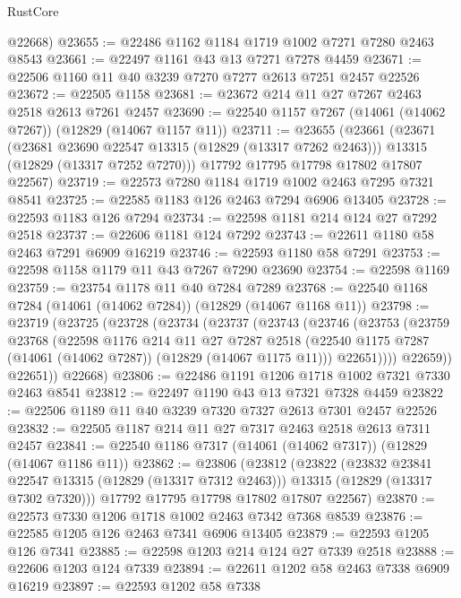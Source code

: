 \begin{lexlean}{RustCore}
\begin{coremodule}
      @22668)
@23655 := @22486 @1162 @1184 @1719 @1002 @7271 @7280 @2463 @8543
@23661 := @22497 @1161 @43 @13 @7271 @7278 @4459
@23671 := @22506 @1160 @11 @40 @3239 @7270 @7277 @2613 @7251 @2457 @22526
@23672 := @22505 @1158
@23681 := @23672 @214 @11 @27 @7267 @2463 @2518 @2613 @7261 @2457
@23690 := @22540 @1157 @7267 (@14061 (@14062 @7267)) (@12829 (@14067 @1157 @11))
@23711 := @23655
    (@23661
      (@23671
        (@23681 @23690 @22547 @13315 (@12829 (@13317 @7262 @2463)))
        @13315
        (@12829 (@13317 @7252 @7270)))
      @17792
      @17795
      @17798
      @17802
      @17807
      @22567)
@23719 := @22573 @7280 @1184 @1719 @1002 @2463 @7295 @7321 @8541
@23725 := @22585 @1183 @126 @2463 @7294 @6906 @13405
@23728 := @22593 @1183 @126 @7294
@23734 := @22598 @1181 @214 @124 @27 @7292 @2518
@23737 := @22606 @1181 @124 @7292
@23743 := @22611 @1180 @58 @2463 @7291 @6909 @16219
@23746 := @22593 @1180 @58 @7291
@23753 := @22598 @1158 @1179 @11 @43 @7267 @7290 @23690
@23754 := @22598 @1169
@23759 := @23754 @1178 @11 @40 @7284 @7289
@23768 := @22540 @1168 @7284 (@14061 (@14062 @7284)) (@12829 (@14067 @1168 @11))
@23798 := @23719
    (@23725
      (@23728
        (@23734
          (@23737
            (@23743
              (@23746
                (@23753
                  (@23759
                    @23768
                    (@22598
                      @1176
                      @214
                      @11
                      @27
                      @7287
                      @2518
                      (@22540 @1175 @7287 (@14061 (@14062 @7287)) (@12829 (@14067 @1175 @11)))
                      @22651))))
              @22659))
          @22651))
      @22668)
@23806 := @22486 @1191 @1206 @1718 @1002 @7321 @7330 @2463 @8541
@23812 := @22497 @1190 @43 @13 @7321 @7328 @4459
@23822 := @22506 @1189 @11 @40 @3239 @7320 @7327 @2613 @7301 @2457 @22526
@23832 := @22505 @1187 @214 @11 @27 @7317 @2463 @2518 @2613 @7311 @2457
@23841 := @22540 @1186 @7317 (@14061 (@14062 @7317)) (@12829 (@14067 @1186 @11))
@23862 := @23806
    (@23812
      (@23822
        (@23832 @23841 @22547 @13315 (@12829 (@13317 @7312 @2463)))
        @13315
        (@12829 (@13317 @7302 @7320)))
      @17792
      @17795
      @17798
      @17802
      @17807
      @22567)
@23870 := @22573 @7330 @1206 @1718 @1002 @2463 @7342 @7368 @8539
@23876 := @22585 @1205 @126 @2463 @7341 @6906 @13405
@23879 := @22593 @1205 @126 @7341
@23885 := @22598 @1203 @214 @124 @27 @7339 @2518
@23888 := @22606 @1203 @124 @7339
@23894 := @22611 @1202 @58 @2463 @7338 @6909 @16219
@23897 := @22593 @1202 @58 @7338

\end{coremodule}
\end{lexlean}
